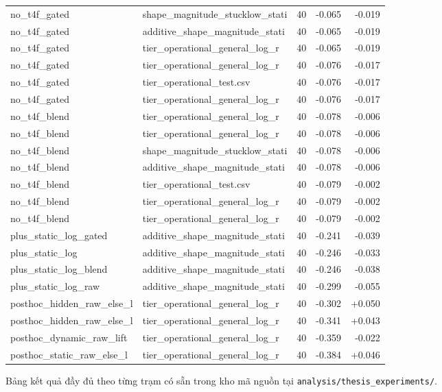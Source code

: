\documentclass[../DoAn.tex]{subfiles}
\begin{document}
{\begin{longtable}{p{3.5cm}p{3.5cm}rr r}
  no\_t4f\_gated & shape\_magnitude\_stucklow\_stati & 40 & -0.065 & -0.019 \\
  no\_t4f\_gated & additive\_shape\_magnitude\_stati & 40 & -0.065 & -0.019 \\
  no\_t4f\_gated & tier\_operational\_general\_log\_r & 40 & -0.065 & -0.019 \\
  no\_t4f\_gated & tier\_operational\_general\_log\_r & 40 & -0.076 & -0.017 \\
  no\_t4f\_gated & tier\_operational\_test.csv & 40 & -0.076 & -0.017 \\
  no\_t4f\_gated & tier\_operational\_general\_log\_r & 40 & -0.076 & -0.017 \\
  no\_t4f\_blend & tier\_operational\_general\_log\_r & 40 & -0.078 & -0.006 \\
  no\_t4f\_blend & tier\_operational\_general\_log\_r & 40 & -0.078 & -0.006 \\
  no\_t4f\_blend & shape\_magnitude\_stucklow\_stati & 40 & -0.078 & -0.006 \\
  no\_t4f\_blend & additive\_shape\_magnitude\_stati & 40 & -0.078 & -0.006 \\
  no\_t4f\_blend & tier\_operational\_test.csv & 40 & -0.079 & -0.002 \\
  no\_t4f\_blend & tier\_operational\_general\_log\_r & 40 & -0.079 & -0.002 \\
  no\_t4f\_blend & tier\_operational\_general\_log\_r & 40 & -0.079 & -0.002 \\
  plus\_static\_log\_gated & additive\_shape\_magnitude\_stati & 40 & -0.241 & -0.039 \\
  plus\_static\_log & additive\_shape\_magnitude\_stati & 40 & -0.246 & -0.033 \\
  plus\_static\_log\_blend & additive\_shape\_magnitude\_stati & 40 & -0.246 & -0.038 \\
  plus\_static\_log\_raw & additive\_shape\_magnitude\_stati & 40 & -0.299 & -0.055 \\
  posthoc\_hidden\_raw\_else\_l & tier\_operational\_general\_log\_r & 40 & -0.302 & +0.050 \\
  posthoc\_hidden\_raw\_else\_l & tier\_operational\_general\_log\_r & 40 & -0.341 & +0.043 \\
  posthoc\_dynamic\_raw\_lift & tier\_operational\_general\_log\_r & 40 & -0.359 & -0.022 \\
  posthoc\_static\_raw\_else\_l & tier\_operational\_general\_log\_r & 40 & -0.384 & +0.046 \\
\bottomrule
\end{longtable}
}

Bảng kết quả đầy đủ theo từng trạm có sẵn trong kho mã nguồn tại \texttt{analysis/thesis\_experiments/}.
\end{document}
